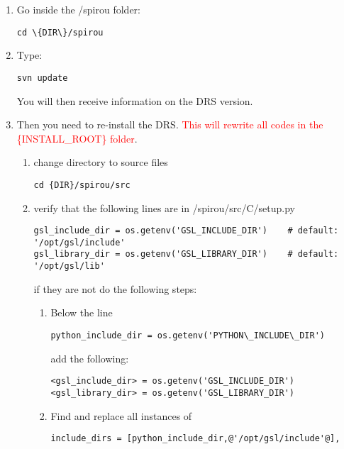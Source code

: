 \begin{enumerate}
\item Go inside the /spirou folder:
\begin{lstlisting}[style=bashstyle]
cd \{DIR\}/spirou
\end{lstlisting}

\item Type:
\begin{lstlisting}[style=bashstyle]
svn update
\end{lstlisting}

You will then receive information on the DRS version.



\item Then you need to re-install the DRS. \textcolor{red}{This will rewrite all codes in the \{INSTALL\_ROOT\} folder}.

\begin{enumerate}
\item change directory to source files
\begin{lstlisting}[style=bashstyle]
cd {DIR}/spirou/src
\end{lstlisting}

\item verify that the following lines are in /spirou/src/C/setup.py
\begin{lstlisting}[style=text]
gsl_include_dir = os.getenv('GSL_INCLUDE_DIR')    # default: '/opt/gsl/include'
gsl_library_dir = os.getenv('GSL_LIBRARY_DIR')    # default: '/opt/gsl/lib'
\end{lstlisting}


if they are not do the following steps:

\begin{enumerate}
\item Below the line
\begin{lstlisting}[style=text]
python_include_dir = os.getenv('PYTHON\_INCLUDE\_DIR') 
\end{lstlisting}
add the following:
\begin{lstlisting}[style=text]
<gsl_include_dir> = os.getenv('GSL_INCLUDE_DIR')
<gsl_library_dir> = os.getenv('GSL_LIBRARY_DIR')
\end{lstlisting}

\item Find and replace all instances of
\begin{lstlisting}[style=text]
include_dirs = [python_include_dir,@'/opt/gsl/include'@],
\end{lstlisting}


\end{enumerate}
\end{enumerate}
\end{enumerate}
